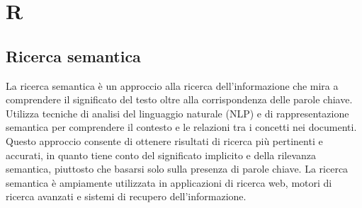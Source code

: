 \section{R}

\vspace{2em}
\subsection*{Ricerca semantica}
La ricerca semantica è un approccio alla ricerca dell'informazione che mira a comprendere il significato del testo oltre alla corrispondenza delle parole chiave. Utilizza tecniche di analisi del linguaggio naturale (NLP) e di rappresentazione semantica per comprendere il contesto e le relazioni tra i concetti nei documenti. Questo approccio consente di ottenere risultati di ricerca più pertinenti e accurati, in quanto tiene conto del significato implicito e della rilevanza semantica, piuttosto che basarsi solo sulla presenza di parole chiave. La ricerca semantica è ampiamente utilizzata in applicazioni di ricerca web, motori di ricerca avanzati e sistemi di recupero dell'informazione.
